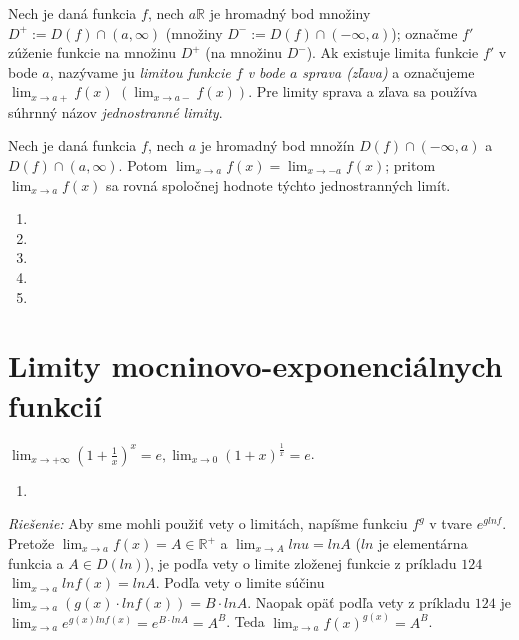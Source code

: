 Nech je daná funkcia $f$, nech $a \mathbb{R}$ je hromadný bod množiny $D^+:=D(f)\cap (a,\infty)$ (množiny $D^-:=D(f)\cap (-\infty,a)$); označme $f'$ zúženie funkcie na množinu $D^+$ (na množinu $D^-$). Ak existuje limita funkcie $f'$ v bode $a$, nazývame ju \textit{limitou funkcie $f$ v bode $a$ sprava (zľava)} a označujeme $\lim_{x \rightarrow a+} f(x)$ $(\lim_{x \rightarrow a-} f(x))$. Pre limity sprava a zľava sa používa súhrnný názov \textit{jednostranné limity}.

\begin{veta}
Nech je daná funkcia $f$, nech $a$ je hromadný bod množín $D(f) \cap (-\infty,a)$ a $D(f) \cap (a,\infty)$. Potom $\lim_{x \rightarrow a} f(x)=\lim_{x \rightarrow -a} f(x)$; pritom $\lim_{x \rightarrow a} f(x)$ sa rovná spoločnej hodnote týchto jednostranných limít.
\end{veta}

\begin{enumerate}[resume]
	\item {}
	\item {}
	\item {}
	\item {}
	\item {}
\end{enumerate}

\section{Limity mocninovo-exponenciálnych funkcií}

\begin{veta}
$\lim_{x \rightarrow +\infty} (1+\frac{1}{x})^x=e,\lim_{x \rightarrow 0} (1+x)^{\frac{1}{x}}=e$.
\end{veta}

\begin{enumerate}[resume]
	\item {}
\end{enumerate}

\textit{Riešenie:}
Aby sme mohli použiť vety o limitách, napíšme funkciu $f^g$ v tvare $e^{g ln f}$. Pretože  $\lim_{x \rightarrow a} f(x)=A \in \mathbb{R^+}$ a $\lim_{x \rightarrow A} ln u= ln A$ ($ln$ je elementárna funkcia a $A \in D(ln)$), je podľa vety o limite zloženej funkcie z príkladu $124$ $\lim_{x \rightarrow a} ln f(x)=ln A$. Podľa vety o limite súčinu $\lim_{x \rightarrow a} (g(x)\cdot ln f(x))=B \cdot ln A$. Naopak opäť podľa vety z príkladu $124$ je $\lim_{x \rightarrow a} e^{g(x)ln f(x)}=e^{B \cdot ln A}=A^B$. Teda $\lim_{x \rightarrow a} f(x)^{g(x)}=A^B$.



